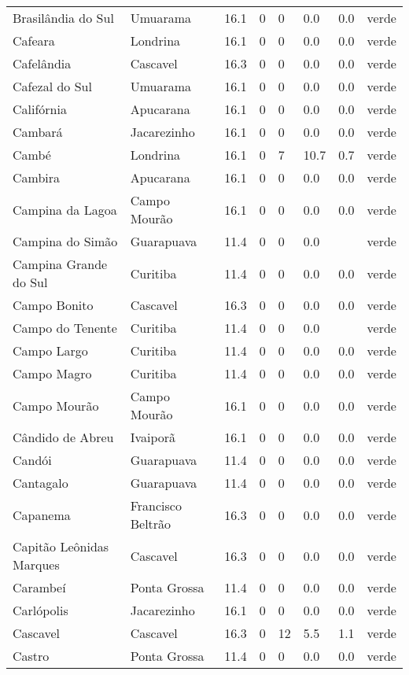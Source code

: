 \begin{longtable}{l|lllllll}
  Brasilândia do Sul & Umuarama & 16.1 & 0 & 0 & 0.0 & 0.0 & verde \\ 
  Cafeara & Londrina & 16.1 & 0 & 0 & 0.0 & 0.0 & verde \\ 
  Cafelândia & Cascavel & 16.3 & 0 & 0 & 0.0 & 0.0 & verde \\ 
  Cafezal do Sul & Umuarama & 16.1 & 0 & 0 & 0.0 & 0.0 & verde \\ 
  Califórnia & Apucarana & 16.1 & 0 & 0 & 0.0 & 0.0 & verde \\ 
  Cambará & Jacarezinho & 16.1 & 0 & 0 & 0.0 & 0.0 & verde \\ 
  Cambé & Londrina & 16.1 & 0 & 7 & 10.7 & 0.7 & verde \\ 
  Cambira & Apucarana & 16.1 & 0 & 0 & 0.0 & 0.0 & verde \\ 
  Campina da Lagoa & Campo Mourão & 16.1 & 0 & 0 & 0.0 & 0.0 & verde \\ 
  Campina do Simão & Guarapuava & 11.4 & 0 & 0 & 0.0 &  & verde \\ 
  Campina Grande do Sul & Curitiba & 11.4 & 0 & 0 & 0.0 & 0.0 & verde \\ 
  Campo Bonito & Cascavel & 16.3 & 0 & 0 & 0.0 & 0.0 & verde \\ 
  Campo do Tenente & Curitiba & 11.4 & 0 & 0 & 0.0 &  & verde \\ 
  Campo Largo & Curitiba & 11.4 & 0 & 0 & 0.0 & 0.0 & verde \\ 
  Campo Magro & Curitiba & 11.4 & 0 & 0 & 0.0 & 0.0 & verde \\ 
  Campo Mourão & Campo Mourão & 16.1 & 0 & 0 & 0.0 & 0.0 & verde \\ 
  Cândido de Abreu & Ivaiporã & 16.1 & 0 & 0 & 0.0 & 0.0 & verde \\ 
  Candói & Guarapuava & 11.4 & 0 & 0 & 0.0 & 0.0 & verde \\ 
  Cantagalo & Guarapuava & 11.4 & 0 & 0 & 0.0 & 0.0 & verde \\ 
  Capanema & Francisco Beltrão & 16.3 & 0 & 0 & 0.0 & 0.0 & verde \\ 
  Capitão Leônidas Marques & Cascavel & 16.3 & 0 & 0 & 0.0 & 0.0 & verde \\ 
  Carambeí & Ponta Grossa & 11.4 & 0 & 0 & 0.0 & 0.0 & verde \\ 
  Carlópolis & Jacarezinho & 16.1 & 0 & 0 & 0.0 & 0.0 & verde \\ 
  Cascavel & Cascavel & 16.3 & 0 & 12 & 5.5 & 1.1 & verde \\ 
  Castro & Ponta Grossa & 11.4 & 0 & 0 & 0.0 & 0.0 & verde \\ 

\end{longtable}
